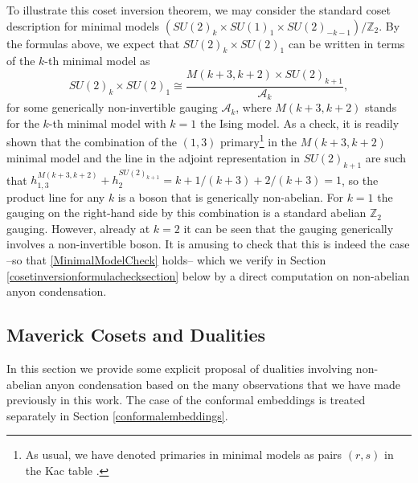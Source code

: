 \documentclass[11pt]{article}
\numberwithin{equation}{section}
\begin{document}
To illustrate this coset inversion theorem, we may consider the standard coset description for minimal models $(SU(2)_{k} \times SU(1)_{1} \times SU(2)_{-k-1})/\mathbb{Z}_{2}$. By the formulas above, we expect that $SU(2)_{k} \times SU(2)_{1}$ can be written in terms of the $k$-th minimal model as
\begin{equation} \label{MinimalModelCheck}
    SU(2)_{k} \times SU(2)_{1} \cong \frac{M(k+3,k+2) \times SU(2)_{k+1}}{\mathcal{A}_{k}},
\end{equation}
for some generically non-invertible gauging $\mathcal{A}_{k}$, where $M(k+3,k+2)$ stands for the $k$-th minimal model with $k=1$ the Ising model. As a check, it is readily shown that the combination of the $(1,3)$ primary\footnote{As usual, we have denoted primaries in minimal models as pairs $(r,s)$ in the Kac table \cite{DiFrancesco:1997nk}.} in the $M(k+3,k+2)$ minimal model and the line in the adjoint representation in $SU(2)_{k+1}$ are such that $h^{M(k+3,k+2)}_{1,3} + h^{SU(2)_{k+1}}_{2} = k+1/(k+3) + 2/(k+3) = 1$, so the product line for any $k$ is a boson that is generically non-abelian. For $k=1$ the gauging on the right-hand side by this combination is a standard abelian $\mathbb{Z}_{2}$ gauging. However, already at $k=2$ it can be seen that the gauging generically involves a non-invertible boson. It is amusing to check that this is indeed the case --so that \eqref{MinimalModelCheck} holds-- which we verify in Section \ref{cosetinversionformulachecksection} below by a direct computation on non-abelian anyon condensation. 


\subsection{Maverick Cosets and Dualities} \label{maverickdualities}




In this section we provide some explicit proposal of dualities involving non-abelian anyon condensation based on the many observations that we have made previously in this work. The case of the conformal embeddings is treated separately in Section \ref{conformalembeddings}. 
\end{document}
